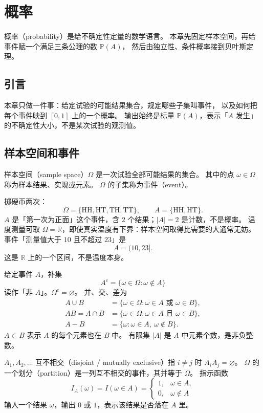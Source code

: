 \chapter{概率}

概率（probability）是给不确定性定量的数学语言。
本章先固定样本空间，再给事件赋一个满足三条公理的数 $\mathbb{P}(A)$，
然后由独立性、条件概率接到贝叶斯定理。

\section{引言}

本章只做一件事：给定试验的可能结果集合，规定哪些子集叫事件，
以及如何把每个事件映到 $[0,1]$ 上的一个概率。
输出始终是标量 $\mathbb{P}(A)$，表示「$A$ 发生」的不确定性大小，不是某次试验的观测值。

\section{样本空间和事件}

样本空间（sample space）$\Omega$ 是一次试验全部可能结果的集合。
其中的点 $\omega\in\Omega$ 称为样本结果、实现或元素。
$\Omega$ 的子集称为事件（event）。

掷硬币两次：
\[
\Omega=\{\mathrm{HH},\mathrm{HT},\mathrm{TH},\mathrm{TT}\},\qquad
A=\{\mathrm{HH},\mathrm{HT}\}.
\]
$A$ 是「第一次为正面」这个事件，含 $2$ 个结果；$\lvert A\rvert=2$ 是计数，不是概率。
温度测量可取 $\Omega=\mathbb{R}$，即使真实温度有下界：样本空间取得比需要的大通常无妨。
事件「测量值大于 $10$ 且不超过 $23$」是
\[
A=(10,23].
\]
这是 $\mathbb{R}$ 上的一个区间，不是温度本身。

给定事件 $A$，补集
\[
A^{c}=\{\omega\in\Omega:\omega\notin A\}
\]
读作「非 $A$」。$\Omega^{c}=\varnothing$。
并、交、差为
\begin{align}
A\cup B&=\{\omega\in\Omega:\omega\in A\text{ 或 }\omega\in B\},\\
AB=A\cap B&=\{\omega\in\Omega:\omega\in A\text{ 且 }\omega\in B\},\\
A-B&=\{\omega:\omega\in A,\ \omega\notin B\}.
\end{align}
$A\subset B$ 表示 $A$ 的每个元素也在 $B$ 中。
有限集 $\lvert A\rvert$ 是 $A$ 中元素个数，是非负整数。

$A_1,A_2,\ldots$ 互不相交（disjoint / mutually exclusive）指 $i\neq j$ 时 $A_iA_j=\varnothing$。
$\Omega$ 的一个划分（partition）是一列互不相交的事件，其并等于 $\Omega$。
指示函数
\[
I_A(\omega)=I(\omega\in A)=\begin{cases}
1,&\omega\in A,\\
0,&\omega\notin A
\end{cases}
\]
输入一个结果 $\omega$，输出 $0$ 或 $1$，表示该结果是否落在 $A$ 里。

